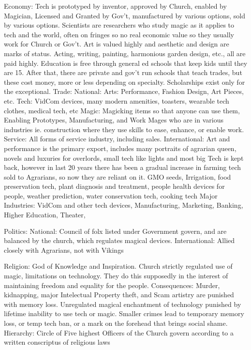 \documentclass[blue]{GL2020}
\begin{document}
Economy:		Tech is prototyped by inventor, approved by Church, enabled by Magician, Licensed and Granted 
						by Gov't, manufactured by various options, sold by various options.  Scientists are researchers 
						who study magic as it applies to tech and the world, often on fringes so no real economic value 
						so they usually work for Church or Gov't.
						Art is valued highly and aesthetic and design are marks of status.  Acting, writing, painting,
						harmonious garden design, etc., all are paid highly.
						Education is free through general ed schools that keep kids until they are 15.  After that, there
						are private and gov't run schools that teach trades, but these cost money, more or less depending 
						on specialty.  Scholarships exist only for the exceptional.
	Trade:		National:		Arts:		Performance, Fashion Design, Art Pieces, etc.
												Tech:		VidCom devices, many modern amenities, toasters, wearable tech clothes, 
												medical tech, etc
												Magic:		Magicking items so that anyone can use them, Enabling Prototypes,
												Manufacturing, and Work Mages who are in various industries ie. construction 
												where they use skills to ease, enhance, or enable work.
												Service:		All forms of service industry, including sales.
						International:		Art and performance is the primary export, includes many portraits of agrarian queen, novels and luxuries for overlords, small tech like lights and most big Tech is kept back, however in last 20 years there has been a gradual increase in farming tech sold to Agrarians, so now they are reliant on it.  GMO seeds, Irrigation, food preservation tech, plant diagnosis and treatment, people health devices for people, weather prediction, water conservation tech, cooking tech
	Major Industries:  VidCom and other tech devices, Manufacturing, Marketing, Banking, Higher Education, Theater, 
	
Politics:
	National: Council of folx listed under Government govern, and are balanced by the church, which regulates magical devices.
	International:  Allied closely with Agrarians, not with Vikings
	
Religion:		God of Knowledge and Inspiration.  Church strictly regulated use of magic, limitations on technology.  They do this supposedly in the interest of maintaining freedom and equality for the people.  
	Consequences:  Murder, kidnapping, major Intelectual Property theft, and Scam artistry are punished with memory loss.  Unregulated magical enchantment of technology punished by lifetime inability to use tech or magic.  Smaller crimes lead to temporary memory loss, or temp tech ban, or a mark on the forehead that brings social shame.
	Hierarchy:  Circle of Five highest Officers of the Church govern according to a written conscriptus of religious laws
	
\end{document}

